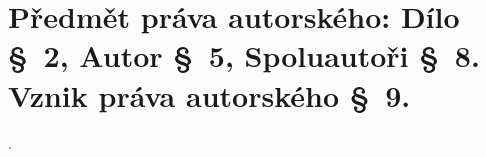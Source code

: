 \section{Předmět práva autorského: Dílo §~2, Autor §~5, Spoluautoři §~8. Vznik práva autorského §~9.}.